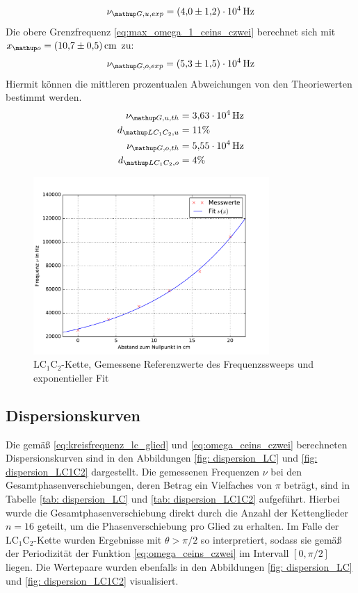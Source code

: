 \begin{equation}
  \nu\ua{G, u, exp} = \SI{4.0(12)e4}{\hertz}
\end{equation}
Die obere Grenzfrequenz \eqref{eq:max_omega_1_ceins_czwei} berechnet sich mit $x\ua{o} = \SI{10.7(5)}{\cm}$ zu:
\begin{equation}
    \nu\ua{G, o, exp} = \SI{5.3(15)e4}{\hertz}
\end{equation}
Hiermit können die mittleren prozentualen Abweichungen von den Theoriewerten bestimmt werden.
\begin{align}
  \nu\ua{G,u,th} &= \SI{3.63e4}{\hertz}\\
  d\ua{LC_1C_2,u} &= 11 \%\\
  \nu\ua{G,o,th} &= \SI{5.55e4}{\hertz}\\
  d\ua{LC_1C_2, o} &= 4 \%
\end{align}
\FloatBarrier
\begin{figure}
  \centering
  \includegraphics[width = 0.8\textwidth]{../Messdaten/plots/frequenzsweep_LC1C2.pdf}
  \caption{$\mathup{LC_1C_2}$-Kette, Gemessene Referenzwerte des Frequenzssweeps und exponentieller Fit}
  \label{fig: plot_sweep_LC1C2}
\end{figure}
\newpage
\subsection{Dispersionskurven}
Die gemäß \eqref{eq:kreisfrequenz_lc_glied} und \eqref{eq:omega_ceins_czwei} berechneten Dispersionskurven sind in den Abbildungen \ref{fig: dispersion_LC} und \ref{fig: dispersion_LC1C2}
dargestellt. Die gemessenen Frequenzen $\nu$ bei den Gesamtphasenverschiebungen, deren Betrag ein Vielfaches von $\pi$ beträgt,
sind in Tabelle \ref{tab: dispersion_LC} und \ref{tab: dispersion_LC1C2} aufgeführt. Hierbei wurde die Gesamtphasenverschiebung direkt durch die
Anzahl der Kettenglieder $n = 16$ geteilt, um die Phasenverschiebung pro Glied zu erhalten. Im Falle der $\mathup{LC_1C_2}$-Kette
wurden Ergebnisse mit $\theta > \pi/2$ so interpretiert, sodass sie gemäß der Periodizität der Funktion \eqref{eq:omega_ceins_czwei} im Intervall
$[0, \pi/2]$ liegen. Die Wertepaare wurden ebenfalls in den Abbildungen \ref{fig: dispersion_LC} und \ref{fig: dispersion_LC1C2} visualisiert.



